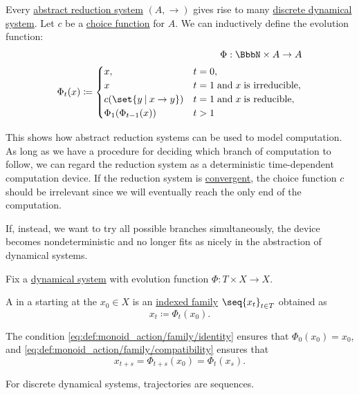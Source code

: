 \begin{example}\label{ex:abstract_reductions_as_dynamical_systems}
  Every \hyperref[def:abstract_reduction_system]{abstract reduction system} \( (A, \to) \) gives rise to many \hyperref[def:dynamical_system]{discrete dynamical system}. Let \( c \) be a \hyperref[def:choice_function]{choice function} for \( A \). We can inductively define the evolution function:
  \begin{equation*}
    \begin{aligned}
      \Phi: \BbbN \times A \to A \\
      \Phi_t(x) \coloneqq \begin{cases}
        x,                          &t = 0, \\
        x                           &t = 1 \T{and} x \T{is irreducible}, \\
        c(\set{ y \given x \to y }) &t = 1 \T{and} x \T{is reducible}, \\
        \Phi_1(\Phi_{t-1}(x))       &t > 1
      \end{cases}
    \end{aligned}
  \end{equation*}

  This shows how abstract reduction systems can be used to model computation. As long as we have a procedure for deciding which branch of computation to follow, we can regard the reduction system as a deterministic time-dependent computation device. If the reduction system is \hyperref[def:abstract_rewriting_convergence/convergent]{convergent}, the choice function \( c \) should be irrelevant since we will eventually reach the only end of the computation.

  If, instead, we want to try all possible branches simultaneously, the device becomes nondeterministic and no longer fits as nicely in the abstraction of dynamical systems.
\end{example}

\begin{definition}\label{def:dynamical_system_trajectory}
  Fix a \hyperref[def:dynamical_system]{dynamical system} with evolution function \( \Phi: T \times X \to X \).

  A  in a starting at the  \( x_0 \in X \) is an \hyperref[def:cartesian_product/indexed_family]{indexed family} \( \seq{ x_t }_{t \in T} \) obtained as
  \begin{equation*}
    x_t \coloneqq \Phi_t(x_0).
  \end{equation*}

  The condition \ref{eq:def:monoid_action/family/identity} ensures that \( \Phi_0(x_0) = x_0 \), and \ref{eq:def:monoid_action/family/compatibility} ensures that
  \begin{equation*}
    x_{t + s}
    =
    \Phi_{t + s}(x_0)
    =
    \Phi_t(x_s).
  \end{equation*}

  For discrete dynamical systems, trajectories are sequences.
\end{definition}

